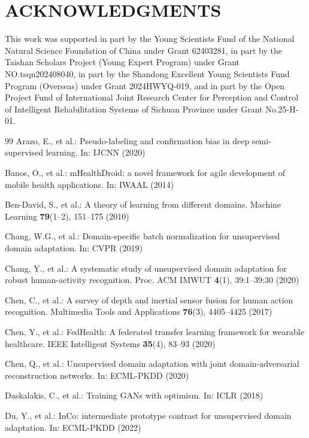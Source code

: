 \documentclass[conference]{IEEEtran}
\begin{document}
\section*{ACKNOWLEDGMENTS}
This work was supported in part by the Young Scientists
Fund of the National Natural Science Foundation of China
under Grant 62403281, in part by the Taishan Scholars Project
(Young Expert Program) under Grant NO.tsqn202408040, in
part by the Shandong Excellent Young Scientists Fund Program
(Overseas) under Grant 2024HWYQ-019, and in part by the
Open Project Fund of International Joint Research Center for
Perception and Control of Intelligent Rehabilitation Systems
of Sichuan Province under Grant No.25-H-01.

\begin{thebibliography}{99}
Arazo, E., et al.: Pseudo-labeling and confirmation bias in deep semi-supervised learning. In: IJCNN (2020)

Banos, O., et al.: mHealthDroid: a novel framework for agile development of mobile health applications. In: IWAAL (2014)

Ben-David, S., et al.: A theory of learning from different domains. Machine Learning \textbf{79}(1--2), 151--175 (2010)

Chang, W.G., et al.: Domain-specific batch normalization for unsupervised domain adaptation. In: CVPR (2019)

Chang, Y., et al.: A systematic study of unsupervised domain adaptation for robust human-activity recognition. Proc. ACM IMWUT \textbf{4}(1), 39:1--39:30 (2020)

Chen, C., et al.: A survey of depth and inertial sensor fusion for human action recognition. Multimedia Tools and Applications \textbf{76}(3), 4405--4425 (2017)

Chen, Y., et al.: FedHealth: A federated transfer learning framework for wearable healthcare. IEEE Intelligent Systems \textbf{35}(4), 83--93 (2020)

Chen, Q., et al.: Unsupervised domain adaptation with joint domain-adversarial reconstruction networks. In: ECML-PKDD (2020)

Daskalakis, C., et al.: Training GANs with optimism. In: ICLR (2018)

Du, Y., et al.: InCo: intermediate prototype contrast for unsupervised domain adaptation. In: ECML-PKDD (2022)


\end{thebibliography}
\end{document}
